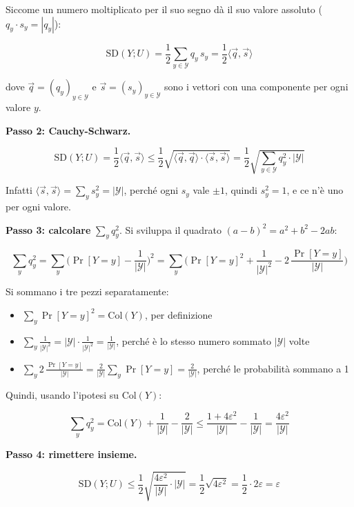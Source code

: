 Siccome un numero moltiplicato per il suo segno dà il suo valore assoluto (\(q_y \cdot s_y = |q_y|\)):

\[
\text{SD}(Y; U) = \frac{1}{2} \sum_{y \in \mathcal{Y}} q_y\, s_y = \frac{1}{2} \langle \vec{q}, \vec{s} \rangle
\]

dove \(\vec{q} = (q_y)_{y \in \mathcal{Y}}\) e \(\vec{s} = (s_y)_{y \in \mathcal{Y}}\) sono i vettori con una componente per ogni valore \(y\).

\textbf{Passo 2: Cauchy-Schwarz.}

\[
\text{SD}(Y; U) = \frac{1}{2} \langle \vec{q}, \vec{s} \rangle \le \frac{1}{2} \sqrt{\langle \vec{q}, \vec{q} \rangle \cdot \langle \vec{s}, \vec{s} \rangle} = \frac{1}{2} \sqrt{\sum_{y \in \mathcal{Y}} q_y^2 \cdot |\mathcal{Y}|}
\]

Infatti \(\langle \vec{s}, \vec{s} \rangle = \sum_y s_y^2 = |\mathcal{Y}|\), perché ogni \(s_y\) vale \(\pm 1\), quindi \(s_y^2 = 1\), e ce n'è uno per ogni valore.

\textbf{Passo 3: calcolare} \(\sum_y q_y^2\). Si sviluppa il quadrato \((a - b)^2 = a^2 + b^2 - 2ab\):

\[
\sum_{y} q_y^2 = \sum_{y} \Big( \Pr[Y = y] - \frac{1}{|\mathcal{Y}|} \Big)^2 = \sum_{y} \Big( \Pr[Y = y]^2 + \frac{1}{|\mathcal{Y}|^2} - 2\,\frac{\Pr[Y = y]}{|\mathcal{Y}|} \Big)
\]

Si sommano i tre pezzi separatamente:

\begin{itemize}
\tightlist
\item
  \(\sum_y \Pr[Y = y]^2 = \text{Col}(Y)\), per definizione
\item
  \(\sum_y \frac{1}{|\mathcal{Y}|^2} = |\mathcal{Y}| \cdot \frac{1}{|\mathcal{Y}|^2} = \frac{1}{|\mathcal{Y}|}\), perché è lo stesso numero sommato \(|\mathcal{Y}|\) volte
\item
  \(\sum_y 2\,\frac{\Pr[Y = y]}{|\mathcal{Y}|} = \frac{2}{|\mathcal{Y}|} \sum_y \Pr[Y = y] = \frac{2}{|\mathcal{Y}|}\), perché le probabilità sommano a 1
\end{itemize}

Quindi, usando l'ipotesi su \(\text{Col}(Y)\):

\[
\sum_{y} q_y^2 = \text{Col}(Y) + \frac{1}{|\mathcal{Y}|} - \frac{2}{|\mathcal{Y}|} \le \frac{1 + 4\varepsilon^2}{|\mathcal{Y}|} - \frac{1}{|\mathcal{Y}|} = \frac{4\varepsilon^2}{|\mathcal{Y}|}
\]

\textbf{Passo 4: rimettere insieme.}

\[
\text{SD}(Y; U) \le \frac{1}{2} \sqrt{\frac{4\varepsilon^2}{|\mathcal{Y}|} \cdot |\mathcal{Y}|} = \frac{1}{2} \sqrt{4\varepsilon^2} = \frac{1}{2} \cdot 2\varepsilon = \varepsilon
\]

